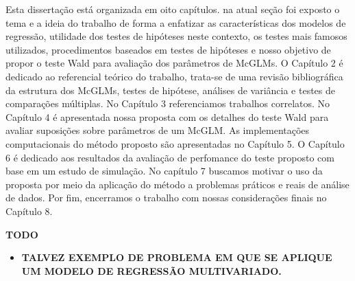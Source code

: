 Esta dissertação está organizada em oito capítulos. na atual seção foi exposto o tema e a ideia do trabalho de forma a enfatizar as características dos modelos de regressão, utilidade dos testes de hipóteses neste contexto, os testes mais famosos utilizados, procedimentos baseados em testes de hipóteses e nosso objetivo de propor o teste Wald para avaliação dos parâmetros de McGLMs. O Capítulo 2 é dedicado ao referencial teórico do trabalho, trata-se de uma revisão bibliográfica da estrutura dos McGLMs, testes de hipótese, análises de variância e testes de comparações múltiplas. No Capítulo 3 referenciamos trabalhos correlatos. No Capítulo 4 é apresentada nossa proposta com os detalhes do teste Wald para avaliar suposições sobre parâmetros de um McGLM. As implementações computacionais do método proposto são apresentadas no Capítulo 5. O Capítulo 6 é dedicado aos resultados da avaliação de perfomance do teste proposto com base em um estudo de simulação. No capítulo 7 buscamos motivar o uso da proposta por meio da aplicação do método a problemas práticos e reais de análise de dados. Por fim, encerramos o trabalho com nossas considerações finais no Capítulo 8.


\vspace{2cm}

\textbf{TODO}
  
\begin{itemize}

  \item \textbf{TALVEZ EXEMPLO DE PROBLEMA EM QUE SE APLIQUE UM MODELO DE REGRESSÃO MULTIVARIADO.}
  
\end{itemize}


